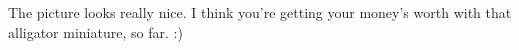  The picture looks really nice. I think you're getting your money's worth with that alligator miniature, so far. :)\\

